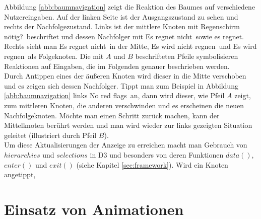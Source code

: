  Abbildung \ref{abb:baumnavigation} zeigt die Reaktion des Baumes auf verschiedene Nutzereingaben. Auf der linken Seite ist der Ausgangszustand zu sehen und rechts der Nachfolgezustand. Links ist der mittlere Knoten mit \glqq Regenschirm nötig?\grqq\ beschriftet und dessen Nachfolger mit \glqq Es regnet nicht\grqq\ sowie \glqq es regnet\grqq. Rechts sieht man \glqq Es regnet nicht\grqq\ in der Mitte, \glqq Es wird nicht regnen\grqq\ und \glqq Es wird regnen\grqq\ als Folgeknoten. Die mit $A$ und $B$ beschrifteten Pfeile symbolisieren Reaktionen auf Eingaben, die im Folgenden genauer beschrieben werden. \\Durch Antippen eines der äußeren Knoten wird dieser in die Mitte verschoben und es zeigen sich dessen Nachfolger. Tippt man zum Beispiel in Abbildung \ref{abb:baumnavigation} links \glqq No red flags\grqq\ an, dann wird dieser, wie Pfeil $A$ zeigt, zum mittleren Knoten, die anderen verschwinden und es erscheinen die neuen Nachfolgeknoten. Möchte man einen Schritt zurück machen, kann der Mittelknoten berührt werden und man wird wieder zur links gezeigten Situation geleitet (illustriert durch Pfeil $B$).\\
 Um diese Aktualisierungen der Anzeige zu erreichen macht man Gebrauch von $hierarchies$ und $selections$ in D3 und besonders von deren Funktionen $data()$, $enter()$ und $exit()$ (siehe Kapitel \ref{sec:framework}). Wird ein Knoten angetippt,
 
 \section{Einsatz von Animationen}\label{sec:animation}